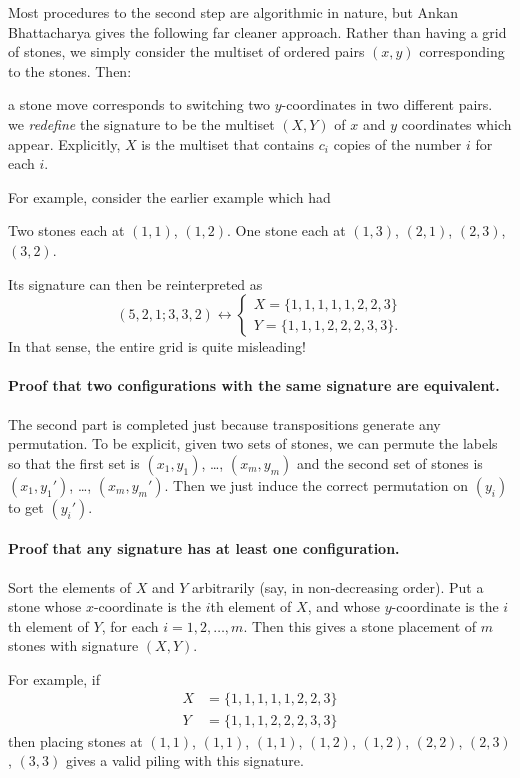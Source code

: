 \documentclass[11pt]{scrartcl}
\begin{document}
Most procedures to the second step are algorithmic in nature,
but Ankan Bhattacharya gives the following far cleaner approach.
Rather than having a grid of stones,
we simply consider the multiset of ordered pairs $(x,y)$
corresponding to the stones.
Then:
\begin{itemize}
  \ii a stone move corresponds to switching two $y$-coordinates
  in two different pairs.
  \ii we \emph{redefine} the signature to be the multiset $(X,Y)$
  of $x$ and $y$ coordinates which appear.
  Explicitly, $X$ is the multiset that contains $c_i$ copies
  of the number $i$ for each $i$.
\end{itemize}
For example, consider the earlier example which had
\begin{itemize}
  \ii Two stones each at $(1,1)$, $(1,2)$.
  \ii One stone each at $(1,3)$, $(2,1)$, $(2,3)$, $(3,2)$.
\end{itemize}
Its signature can then be reinterpreted as
\[
  (5,2,1; 3,3,2)
  \longleftrightarrow
  \begin{cases}
    X = \{1,1,1,1,1,2,2,3\} \\
    Y = \{1,1,1,2,2,2,3,3\}.
  \end{cases}
\]
In that sense, the entire grid is quite misleading!

\paragraph{Proof that two configurations with the same signature are equivalent.}
The second part is completed just because
transpositions generate any permutation.
To be explicit, given two sets of stones,
we can permute the labels so that the first set is
$(x_1, y_1)$, \dots, $(x_m, y_m)$ and
the second set of stones is
$(x_1, y_1')$, \dots, $(x_m, y_m')$.
Then we just induce the correct permutation on $(y_i)$ to get $(y_i')$.

\paragraph{Proof that any signature has at least one configuration.}
Sort the elements of $X$ and $Y$ arbitrarily (say, in non-decreasing order).
Put a stone whose $x$-coordinate is the $i$th element of $X$,
and whose $y$-coordinate is the $i$th element of $Y$,
for each $i = 1, 2, \dots, m$.
Then this gives a stone placement of $m$ stones with signature $(X,Y)$.

For example, if
\begin{align*}
  X &= \{1,1,1,1,1,2,2,3\} \\
  Y &= \{1,1,1,2,2,2,3,3\}
\end{align*}
then placing stones at
$(1,1)$, $(1,1)$, $(1,1)$, $(1,2)$, $(1,2)$, $(2,2)$, $(2,3)$, $(3,3)$
gives a valid piling with this signature.
\pagebreak
\end{document}
